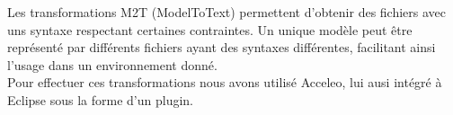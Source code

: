 Les transformations M2T (ModelToText) permettent d'obtenir des fichiers avec uns syntaxe respectant certaines contraintes.
Un unique modèle peut être représenté par différents fichiers ayant des syntaxes différentes, facilitant ainsi l'usage dans un environnement donné.\\

Pour effectuer ces transformations nous avons utilisé Acceleo, lui ausi intégré à Eclipse sous la forme d'un plugin.
